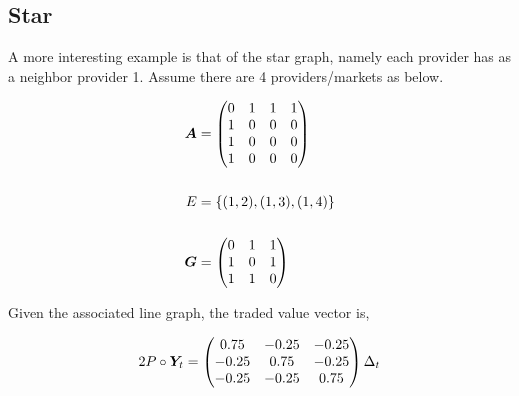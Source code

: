 
\subsection{Star}

A more interesting example is that of the star graph, namely each provider has as a neighbor provider 1. Assume there are 4 providers/markets as below.

\vspace{5mm}
\begin{minipage}{.5\textwidth}
    \resizebox{\textwidth}{!}{}
\end{minipage}
\begin{minipage}{.5\textwidth}
    \begin{equation*}
        \begin{split}
            \matr{A} &= \begin{pmatrix}
                0 & 1 & 1 & 1 \\
                1 & 0 & 0 & 0 \\
                1 & 0 & 0 & 0 \\
                1 & 0 & 0 & 0
            \end{pmatrix} \\
            \vspace{5mm} \\
            E &= \set{(1, 2), (1, 3), (1, 4)} \\
            \vspace{5mm} \\
            \matr{G} &= \begin{pmatrix}
                0 & 1 & 1 \\
                1 & 0 & 1 \\
                1 & 1 & 0
            \end{pmatrix}
        \end{split}
    \end{equation*}
\end{minipage}
\vspace{5mm}

Given the associated line graph, the traded value vector is,

\begin{equation}
    2 P \circ \bm{Y}_t = \begin{pmatrix}
        0.75  & -0.25 & -0.25 \\
        -0.25 & 0.75  & -0.25 \\
        -0.25 & -0.25 & 0.75
    \end{pmatrix} \Delta_t
\end{equation}



